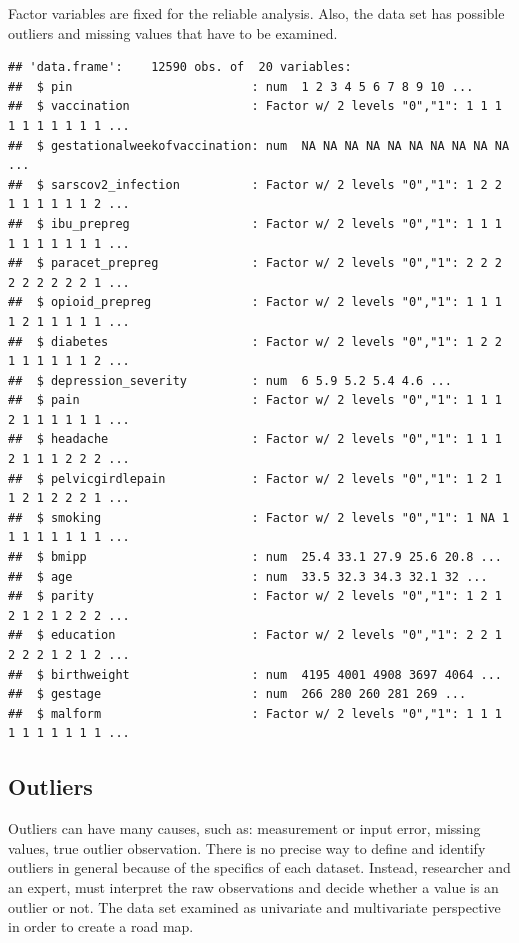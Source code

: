 \documentclass[
]{article}
\begin{document}
Factor variables are fixed for the reliable analysis. Also, the data set
has possible outliers and missing values that have to be examined.

\begin{verbatim}
## 'data.frame':    12590 obs. of  20 variables:
##  $ pin                         : num  1 2 3 4 5 6 7 8 9 10 ...
##  $ vaccination                 : Factor w/ 2 levels "0","1": 1 1 1 1 1 1 1 1 1 1 ...
##  $ gestationalweekofvaccination: num  NA NA NA NA NA NA NA NA NA NA ...
##  $ sarscov2_infection          : Factor w/ 2 levels "0","1": 1 2 2 1 1 1 1 1 1 2 ...
##  $ ibu_prepreg                 : Factor w/ 2 levels "0","1": 1 1 1 1 1 1 1 1 1 1 ...
##  $ paracet_prepreg             : Factor w/ 2 levels "0","1": 2 2 2 2 2 2 2 2 2 1 ...
##  $ opioid_prepreg              : Factor w/ 2 levels "0","1": 1 1 1 1 2 1 1 1 1 1 ...
##  $ diabetes                    : Factor w/ 2 levels "0","1": 1 2 2 1 1 1 1 1 1 2 ...
##  $ depression_severity         : num  6 5.9 5.2 5.4 4.6 ...
##  $ pain                        : Factor w/ 2 levels "0","1": 1 1 1 2 1 1 1 1 1 1 ...
##  $ headache                    : Factor w/ 2 levels "0","1": 1 1 1 2 1 1 1 2 2 2 ...
##  $ pelvicgirdlepain            : Factor w/ 2 levels "0","1": 1 2 1 1 2 1 2 2 2 1 ...
##  $ smoking                     : Factor w/ 2 levels "0","1": 1 NA 1 1 1 1 1 1 1 1 ...
##  $ bmipp                       : num  25.4 33.1 27.9 25.6 20.8 ...
##  $ age                         : num  33.5 32.3 34.3 32.1 32 ...
##  $ parity                      : Factor w/ 2 levels "0","1": 1 2 1 2 1 2 1 2 2 2 ...
##  $ education                   : Factor w/ 2 levels "0","1": 2 2 1 2 2 2 1 2 1 2 ...
##  $ birthweight                 : num  4195 4001 4908 3697 4064 ...
##  $ gestage                     : num  266 280 260 281 269 ...
##  $ malform                     : Factor w/ 2 levels "0","1": 1 1 1 1 1 1 1 1 1 1 ...
\end{verbatim}

\hypertarget{outliers}{%
\subsection{Outliers}\label{outliers}}

Outliers can have many causes, such as: measurement or input error,
missing values, true outlier observation. There is no precise way to
define and identify outliers in general because of the specifics of each
dataset. Instead, researcher and an expert, must interpret the raw
observations and decide whether a value is an outlier or not. The data
set examined as univariate and multivariate perspective in order to
create a road map.
\end{document}
